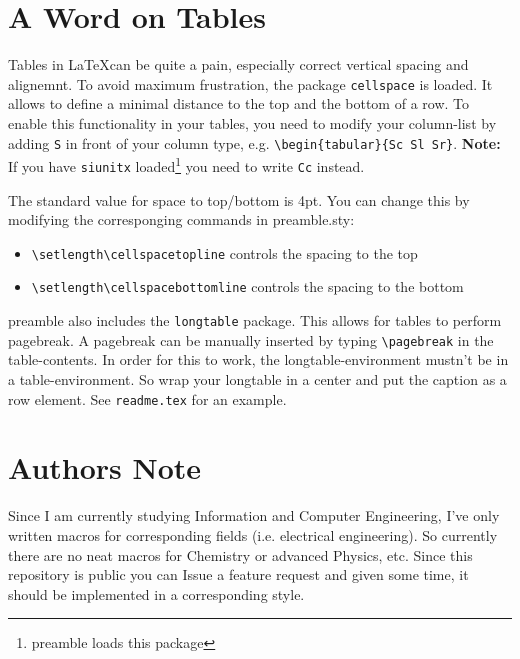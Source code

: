 \documentclass{report}
\begin{document}
  \section{A Word on Tables}
    Tables in \LaTeX can be quite a pain, especially correct vertical spacing and alignemnt. To avoid maximum 
    frustration, the package \lstinline|cellspace| is loaded. It allows to define a minimal distance to the top
    and the bottom of a row. To enable this functionality in your tables, you need to modify your column-list by
    adding \lstinline|S| in front of your column type, e.g. \lstinline|\begin{tabular}{Sc Sl Sr}|. 
    \textbf{Note:} If you have \lstinline|siunitx| loaded\footnote{preamble loads this package} you need to
    write \lstinline|Cc| instead.  

    The standard value for space to top/bottom is 4pt. You can change this by modifying the corresponging commands
    in preamble.sty:
    \begin{itemize}
      \item \lstinline|\setlength\cellspacetopline|  controls the spacing to the top
      \item \lstinline|\setlength\cellspacebottomline| controls the spacing to the bottom
    \end{itemize}

    preamble also includes the \lstinline|longtable| package. This allows for tables to perform pagebreak. A
    pagebreak can be manually inserted by typing \lstinline|\pagebreak| in the table-contents. In order for
    this to work, the longtable-environment mustn't be in a table-environment. So wrap your longtable in
    a center and put the caption as a row element. See \lstinline|readme.tex| for an example.

  \section{Authors Note}
    Since I am currently studying Information and Computer Engineering, I've only written macros for 
    corresponding fields (i.e. electrical engineering). So currently there are no neat macros for Chemistry or
    advanced Physics, etc. Since this repository is public you can Issue a feature request and given some 
    time, it should be implemented in a corresponding style.
\end{document}
